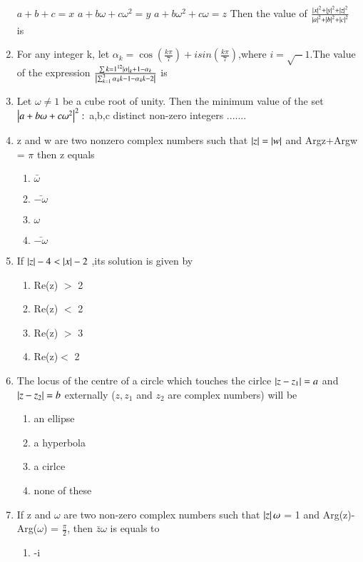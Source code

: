 \begin{enumerate}[label=\arabic*.,ref=\thesubsection.\theenumi]
        $a+b+c = x$
        $a+b\omega+c\omega^2 = y$
        $a+b\omega^2+c\omega = z$
        Then the value of $\frac{\left\vert x\right\vert^2+\left\vert y\right\vert^2+\left\vert z\right\vert ^2}{\left\vert a\right\vert^2+\left\vert b\right\vert^2 +\left\vert c\right\vert^2}$ is 
        \item For any integer k, let $\alpha_k = \cos(\frac{k\pi}{7})+isin(\frac{k\pi}{7})$,where
        $i=\sqrt-1$.The value of the expression  $\frac{\sum{k=1}^{12}\left\vert\alpha\right\vert_k+1-\alpha_k}{\left\vert\sum_{k=1}^{3}\alpha_4k-1-\alpha_4k-2\right\vert}$ is
        \item Let $\omega \neq 1$ be a cube root of unity. Then the minimum value  of the set {${\left\vert a+b\omega+c\omega^2\right\vert^2:}$} a,b,c distinct non-zero integers .......
    \item z and w are two nonzero complex numbers such that $\left\vert z\right\vert = \left\vert w\right\vert$ and Argz+Argw = $\pi$ then z equals
    \begin{enumerate}
    \item  $\bar{\mathbb{\omega}}$
    \item  $\bar{\mathbb{-\omega}}$
    \item  ${\omega}$
    \item  $\bar{-\omega}$
    \end{enumerate}
    \item If $\left\vert z\right\vert-4<\left\vert x\right\vert-2$ ,its solution is given by     
    \begin{enumerate}
    \item  Re(z) $>$ 2
    \item  Re(z) $<$ 2
    \item Re(z) $>$ 3
    \item  Re(z)$<$ 2
    \end{enumerate}
    \item The locus of the centre of a circle which touches the cirlce $\left\vert z-z_1\right\vert = a$ and $\left\vert z-z_2\right\vert = b$ externally        
    ($z,z_1$ and $z_2$ are complex numbers) will be 
    \begin{enumerate}
    \item  an ellipse
    \item  a hyperbola    
    \item  a cirlce
    \item  none of these
    \end{enumerate}
    \item If z and $\omega$ are two non-zero complex numbers such that $\left\vert z\right\vert\omega $ = 1 and Arg(z)-Arg($\omega$) = $\frac{\pi}{2}$, then $\bar{z}\omega$ is equals to 
    \begin{enumerate}
    \item  -i

\end{enumerate}
\end{enumerate}
